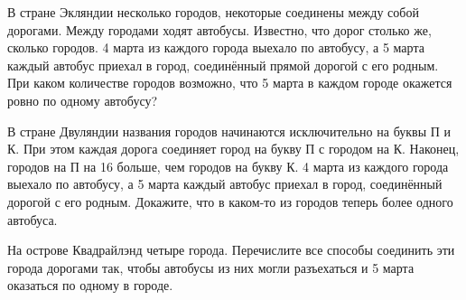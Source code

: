 ﻿
\begin{itemize}

\itA В стране Экляндии несколько городов, некоторые соединены между собой дорогами. Между городами ходят автобусы. Известно, что дорог столько же, сколько городов. 4 марта из каждого города выехало по автобусу, а 5 марта каждый автобус приехал в город, соединённый прямой дорогой с его родным. При каком количестве городов возможно, что 5 марта в каждом городе окажется ровно по одному автобусу?

\itB В стране Двуляндии названия городов начинаются исключительно на буквы П и К. При этом каждая дорога соединяет город на букву П с городом на К. Наконец, городов на П на 16 больше, чем городов на букву К. 4 марта из каждого города выехало по автобусу, а 5 марта каждый автобус приехал в город, соединённый дорогой с его родным. Докажите, что в каком-то из городов теперь более одного автобуса.

\itC На острове Квадрайлэнд четыре города. Перечислите все способы соединить эти города дорогами так, чтобы автобусы из них могли разъехаться и 5 марта оказаться по одному в городе.
\end{itemize}
